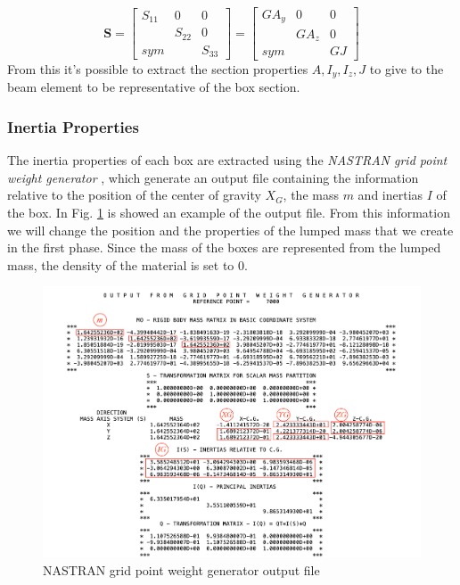 \begin{equation*}
\mathbf{S} =
\begin{bmatrix}
S_{11}&0&0\\
&S_{22}&0\\
sym&&S_{33}
\end{bmatrix}=
\begin{bmatrix}
GA_y&0&0\\
&GA_z&0\\
sym&&GJ
\end{bmatrix}
\end{equation*}
From this it's possible to extract the section properties $A,I_y,I_z,J$ to give to the beam element to be representative of the box section.
\subsubsection{Inertia Properties}
The inertia properties of each box are extracted using the \textit{NASTRAN grid point weight generator} \cite{msc}, which generate an output file containing the information relative to the position of the center of gravity $X_G$, the mass $m$ and inertias $I$ of the box. In Fig. \ref{fig:4_5} is showed an example of the output file. From this information we will change the position and the properties of the lumped mass that we create in the first phase. Since the mass of the boxes are represented from the lumped mass, the density of the material is set to 0.
\begin{figure}[H]
	\centering
	\includegraphics[width = 1\textwidth]{./Immagini/4_5.png}
	\caption{NASTRAN grid point weight generator output file}
	\label{fig:4_5}
\end{figure}
